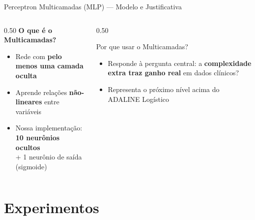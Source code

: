 \documentclass[aspectratio=169,11pt,brazil]{beamer}
\begin{document}
\begin{frame}{Perceptron Multicamadas (MLP) — Modelo e Justificativa}
  \begin{columns}[T]
    \begin{column}{0.50\textwidth}
      \textbf{O que é o Multicamadas?}
      \begin{itemize}
        \item Rede com \textbf{pelo menos uma camada oculta}
        \item Aprende relações \textbf{não-lineares} entre variáveis
        \item Nossa implementação:\\
              \textbf{10 neurônios ocultos}\\
              + 1 neurônio de saída (sigmoide)
      \end{itemize}
    \end{column}
    \begin{column}{0.50\textwidth}
      \begin{block}{Por que usar o Multicamadas?}
        \begin{itemize}
          \item Responde à pergunta central: a \textbf{complexidade extra traz ganho real} em dados clínicos?
          \item Representa o próximo nível acima do ADALINE Logístico
        \end{itemize}
      \end{block}
    \end{column}
  \end{columns}
\end{frame}

\section{Experimentos}
\end{document}

